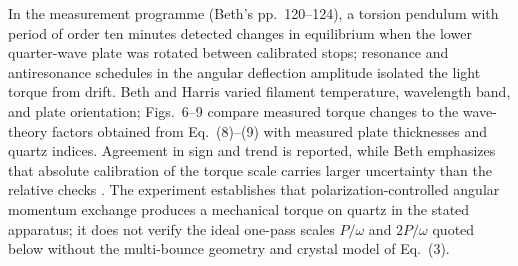 In the measurement programme (Beth's pp.~120--124), a torsion pendulum with period of order ten minutes detected changes in equilibrium when the lower quarter-wave plate was rotated between calibrated stops; resonance and antiresonance schedules in the angular deflection amplitude isolated the light torque from drift. Beth and Harris varied filament temperature, wavelength band, and plate orientation; Figs.~6--9 compare measured torque changes to the wave-theory factors obtained from Eq.~(8)--(9) with measured plate thicknesses and quartz indices. Agreement in sign and trend is reported, while Beth emphasizes that absolute calibration of the torque scale carries larger uncertainty than the relative checks \cite{beth1936}. The experiment establishes that polarization-controlled angular momentum exchange produces a mechanical torque on quartz in the stated apparatus; it does not verify the ideal one-pass scales $P/\omega$ and $2P/\omega$ quoted below without the multi-bounce geometry and crystal model of Eq.~(3).

